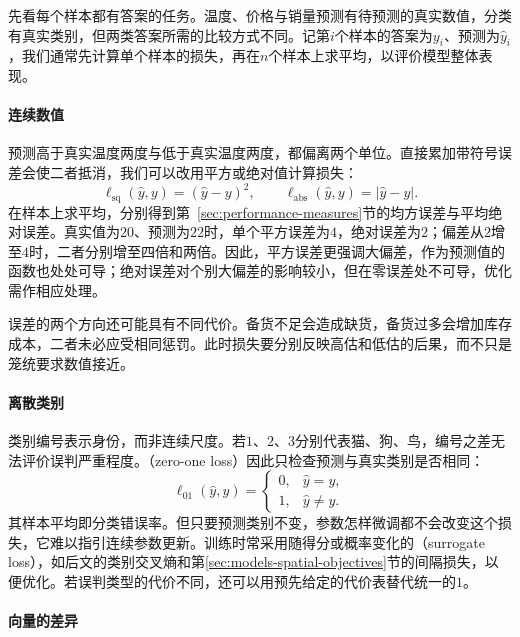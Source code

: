 先看每个样本都有答案的任务。温度、价格与销量预测有待预测的真实数值，分类有真实类别，但两类答案所需的比较方式不同。记第$i$个样本的答案为$y_i$、预测为$\hat y_i$，我们通常先计算单个样本的损失，再在$n$个样本上求平均，以评价模型整体表现。

\paragraph{连续数值}

预测高于真实温度两度与低于真实温度两度，都偏离两个单位。直接累加带符号误差会使二者抵消，我们可以改用平方或绝对值计算损失：
\[
  \ell_{\mathrm{sq}}(\hat y,y)=(\hat y-y)^2,\qquad
  \ell_{\mathrm{abs}}(\hat y,y)=|\hat y-y|.
\]
在样本上求平均，分别得到第~\ref{sec:performance-measures}节的均方误差与平均绝对误差。真实值为$20$、预测为$22$时，单个平方误差为$4$，绝对误差为$2$；偏差从$2$增至$4$时，二者分别增至四倍和两倍。因此，平方误差更强调大偏差，作为预测值的函数也处处可导；绝对误差对个别大偏差的影响较小，但在零误差处不可导，优化需作相应处理。

误差的两个方向还可能具有不同代价。备货不足会造成缺货，备货过多会增加库存成本，二者未必应受相同惩罚。此时损失要分别反映高估和低估的后果，而不只是笼统要求数值接近。

\paragraph{离散类别}

类别编号表示身份，而非连续尺度。若$1$、$2$、$3$分别代表猫、狗、鸟，编号之差无法评价误判严重程度。（zero-one loss）因此只检查预测与真实类别是否相同：
\begin{equation}
  \ell_{01}(\hat{y},y)=
  \begin{cases}
    0, & \hat{y}=y,\\
    1, & \hat{y}\ne y.
  \end{cases}
  \label{eq:models-zero-one-loss}
\end{equation}
其样本平均即分类错误率。但只要预测类别不变，参数怎样微调都不会改变这个损失，它难以指引连续参数更新。训练时常采用随得分或概率变化的（surrogate loss），如后文的类别交叉熵和第\ref{sec:models-spatial-objectives}节的间隔损失，以便优化。若误判类型的代价不同，还可以用预先给定的代价表替代统一的$1$。

\paragraph{向量的差异}
\label{sec:models-vector-objectives}

